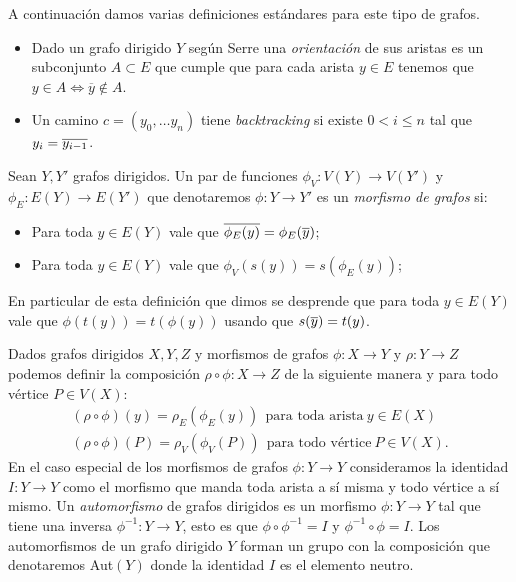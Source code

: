 \documentclass[tesis.tex]{subfiles}
\begin{document}
\begin{leoenv}
\begin{deff}
	
	A continuación damos varias definiciones estándares para este tipo de grafos.

	\begin{itemize}
		\item Dado un grafo dirigido $Y$ según Serre una \emph{orientación} de sus aristas es un subconjunto $A \subset E$ que cumple que para cada arista $y \in E$ tenemos que $y \in A \iff \overline y \notin A$.	

		\item Un camino $c= (y_0, \dots y_n)$ tiene \emph{backtracking} si existe $ 0 < i \le n$ tal que $y_i = \overline{y_{i-1}}$.	
	\end{itemize}
	
	
\end{deff}	


\begin{deff}
	Sean $Y, Y'$ grafos dirigidos. 
	Un par de funciones $\phi_V:V(Y) \to V(Y')$ y $\phi_E: E(Y) \to E(Y')$ que denotaremos $\phi:Y \to Y'$ es un \emph{morfismo de grafos} si:
	\begin{itemize}
		\item Para toda $y \in E(Y)$ vale que $\overline{\phi_{E}(y)} = \phi_{E}(\overline y)$;
		\item Para toda $y \in E(Y)$ vale que $\phi_{V}(s(y)) = s(\phi_{E}(y))$;
	\end{itemize}   
	En particular de esta definición que dimos se desprende que para toda $y \in E(Y)$ vale que $\phi(t(y)) = t(\phi(y))$ usando que $s(\overline y) = t(y)$.
\end{deff}


Dados grafos dirigidos $X,Y,Z$ y morfismos de grafos $\phi:X \to Y$ y $\rho:Y \to Z$ podemos definir la composición $\rho \circ \phi : X \to Z$ de la siguiente manera  y para todo vértice $P \in V(X)$:
\begin{align*}
	(\rho \circ \phi) (y) = \rho_{E} (\phi_{E} (y)) \  \ \text{para toda arista} \ y \in E(X) \\
	(\rho \circ \phi) (P) = \rho_{V} (\phi_{V} (P)) \  \ \text{para todo vértice} \ P \in V(X). 
\end{align*}
En el caso especial de los morfismos de grafos $\phi: Y \to Y$ consideramos la identidad $I: Y \to Y$ como el morfismo que manda toda arista a sí misma y todo vértice a sí mismo.
Un \emph{automorfismo} de grafos dirigidos es un morfismo $\phi:Y \to Y$ tal que tiene una inversa $\phi^{-1}:Y \to Y$, esto es que $\phi \circ \phi^{-1} = I$ y $\phi^{-1} \circ \phi = I$.
Los automorfismos de un grafo dirigido $Y$ forman un grupo con la composición que denotaremos Aut$(Y)$ donde la identidad $I$ es el elemento neutro.


\end{leoenv}
\end{document}

